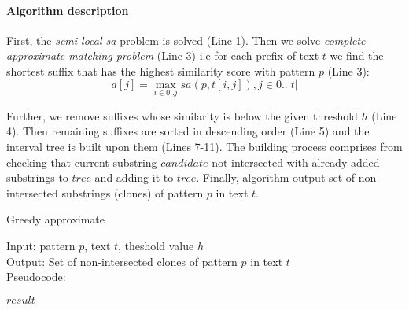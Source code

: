 \paragraph{Algorithm description}
First, the \emph{semi-local sa} problem is solved (Line 1).
Then we solve \emph{complete approximate matching problem} (Line 3) i.e
for each prefix of text $t$ we find the shortest suffix that has the highest similarity score with pattern $p$ (Line 3):
\begin{equation}
    a[j] = \max _{i \in 0 ..j} sa(p,t[i,j]), j \in 0..|t|
\end{equation}

Further, we remove suffixes whose similarity is below the given threshold $h$ (Line 4).
Then remaining suffixes are sorted in descending order (Line 5) and the interval tree is built upon them (Lines 7-11).
The building process comprises from checking that current substring $candidate$ not intersected with already added substrings to $tree$ and adding it to $tree$.
Finally, algorithm output set of non-intersected substrings (clones) of pattern $p$ in text $t$.


\begin{algorithm}[H]
\caption{Greedy approximate}
\label{alg:appximateMatchingMax}
Input: pattern $p$, text $t$, theshold value $h$\\
Output: Set of non-intersected clones of pattern $p$ in text $t$\\
Pseudocode:
\begin{algorithmic}[1]

\ENDIF
\ENDFOR
{}
\RETURN $result$
\end{algorithmic}
\end{algorithm}

